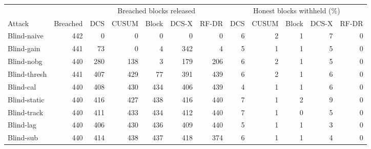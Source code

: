 \begin{tabular}{lrrrrrrrrrrr}
\hline
& & \multicolumn{5}{c}{Breached blocks released} & \multicolumn{5}{c}{Honest blocks withheld (\%)}\\
Attack & Breached & DCS & CUSUM & Block & DCS-X & RF-DR & DCS & CUSUM & Block & DCS-X & RF-DR\\
\hline
Blind-naive & 442 & 0 & 0 & 0 & 0 & 0 & 6 & 2 & 1 & 7 & 0\\
Blind-gain & 441 & 73 & 0 & 4 & 342 & 4 & 5 & 1 & 1 & 5 & 0\\
Blind-nobg & 440 & 280 & 138 & 3 & 179 & 206 & 6 & 2 & 1 & 5 & 0\\
Blind-thresh & 441 & 407 & 429 & 77 & 391 & 439 & 6 & 2 & 1 & 6 & 0\\
Blind-cal & 440 & 408 & 430 & 434 & 406 & 439 & 4 & 1 & 1 & 6 & 0\\
Blind-static & 440 & 416 & 427 & 438 & 416 & 440 & 7 & 1 & 2 & 9 & 0\\
Blind-track & 440 & 411 & 433 & 434 & 412 & 440 & 7 & 1 & 0 & 5 & 0\\
Blind-lag & 440 & 406 & 430 & 436 & 409 & 440 & 5 & 1 & 1 & 3 & 0\\
Blind-sub & 440 & 414 & 438 & 437 & 418 & 374 & 6 & 1 & 1 & 4 & 0\\
\hline
\end{tabular}